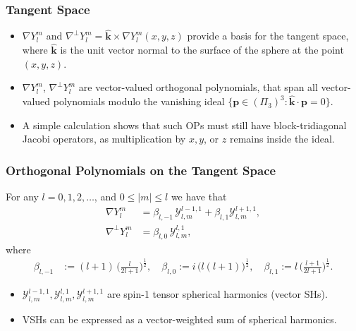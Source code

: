 \documentclass[10pt]{beamer}
\newcommand{\half}{\frac{1}{2}}
\newcommand{\Ylm}{Y^m_l}
\newcommand{\gradYlm}{\nabla Y^m_l}
\newcommand{\gradpYlm}{\nabla^\perp Y^m_l}
\newcommand{\curlyy}{\bm{\mathcal{Y}}}
\newcommand{\blone}{\beta_{l, 1}}
\newcommand{\blzero}{\beta_{l, 0}}
\newcommand{\blmone}{\beta_{l, -1}}
\newcommand{\unitvec}{\hat{\bm{k}}}
\begin{document}
\frame
{
    \frametitle{Tangent Space}

\begin{itemize}

\item $\gradYlm$ and $\gradpYlm = \unitvec \times \gradYlm(x,y,z)$ provide a basis for the tangent space, where \(\unitvec\) is the unit vector normal to the surface of the sphere at the point \((x,y,z)\).

\item \(\gradYlm\), \(\gradpYlm\) are vector-valued orthogonal polynomials, that span all vector-valued polynomials modulo the vanishing ideal $\{ \bm{p} \in (\Pi_3)^3  : \unitvec \cdot \bm{p} = 0 \}$. 

\item A simple calculation shows that such OPs must still have block-tridiagonal Jacobi operators, as multiplication by $x, y$, or $z$ remains inside the ideal. 

\end{itemize}

}

\frame
{
    \frametitle{Orthogonal Polynomials on the Tangent Space}

For any $l = 0, 1, 2, \dots$, and $0 \le |m| \le l$ we have that
\begin{align}
\nabla \Ylm &= \blmone \, \curlyy^{l-1,1}_{l,m} + \blone \curlyy^{l+1,1}_{l,m}, \\
\nabla^\perp \Ylm &= \blzero \, \curlyy^{l,1}_{l,m},
\end{align}
where
\begin{align}
\blmone &:= (l+1) \, \Big(\frac{l}{2l+1}\Big)^\half, \quad
\blzero := i \, \big(l(l+1)\big)^\half, \quad
\blone := l \, \Big(\frac{l+1}{2l+1}\Big)^\half.
\end{align}

\begin{itemize}
\item $\curlyy^{l-1,1}_{l,m}, \curlyy^{l,1}_{l,m}, \curlyy^{l+1,1}_{l,m}$ are spin-1 tensor spherical harmonics (vector SHs).
\item VSHs can be expressed as a vector-weighted sum of spherical harmonics.
\end{itemize}

}
\end{document}
